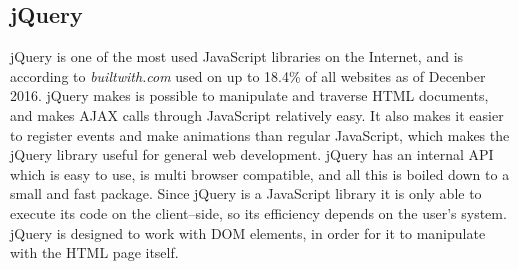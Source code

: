 \subsection{jQuery} \label{ssec:jquery}
jQuery is one of the most used JavaScript libraries on the Internet, and is according to \textit{builtwith.com} used on up to 18.4\% of all websites as of Decenber 2016.\cite{buildwith}
jQuery makes is possible to manipulate and traverse HTML documents, and makes \ac{AJAX} calls through JavaScript relatively easy.
It also makes it easier to register events and make animations than regular JavaScript, which makes the jQuery library useful for general web development.
jQuery has an internal API which is easy to use, is multi browser compatible, and all this is boiled down to a small and fast package.
Since jQuery is a JavaScript library it is only able to execute its code on the client--side, so its efficiency depends on the user's system.
jQuery is designed to work with \ac{DOM} elements, in order for it to manipulate with the HTML page itself.
